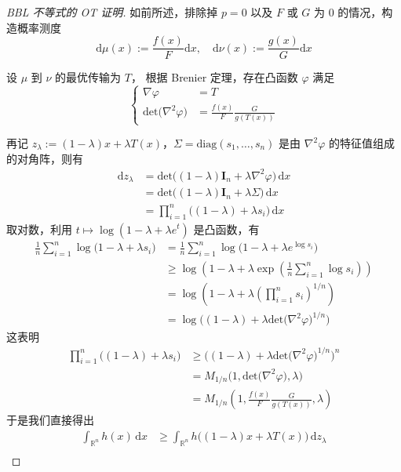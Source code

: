 \begin{proof}[BBL 不等式的 OT 证明]
    
如前所述，排除掉 $p=0$ 以及 $F$ 或 $G$ 为 0 的情况，构造概率测度
\[
\mathrm{d}\mu(x):=\frac{f(x)}{F}\mathrm{d}x,\quad \mathrm{d}\nu(x):=\frac{g(x)}{G}\mathrm{d}x
\]

设 $\mu$ 到 $\nu$ 的最优传输为 $T$， 根据 Brenier 定理，存在凸函数 $\varphi$ 满足
\[
\begin{cases}
\nabla \varphi &=T\\
\mathrm{det}\big(\nabla^2\varphi\big)&=\frac{f(x)}{F}\frac{G}{g(T(x))}
\end{cases}
\]

再记 $z_\lambda:=(1-\lambda)x+\lambda T(x)$，$\Sigma=\mathrm{diag}(s_1,\ldots,s_n)$ 是由 $\nabla^2\varphi$ 的特征值组成的对角阵，则有
\begin{align*}
\mathrm{d}z_\lambda&=\mathrm{det}\big((1-\lambda)\mathbf{I}_n+\lambda \nabla^2\varphi\big)\,\mathrm{d}x\\
&=\mathrm{det}\big((1-\lambda)\mathbf{I}_n+\lambda \Sigma\big)\,\mathrm{d}x\\
&=\prod_{i=1}^n\big((1-\lambda)+\lambda s_i\big)\,\mathrm{d}x
\end{align*}
取对数，利用 $t\mapsto \log(1-\lambda +\lambda e^t)$ 是凸函数，有
\begin{align*}
\frac1n\sum_{i=1}^n\log\big(1-\lambda+\lambda s_i\big)&=\frac1n\sum_{i=1}^n\log\big(1-\lambda+\lambda e^{\log s_i}\big)\\
&\ge \log\left(1-\lambda+\lambda \exp\left(\frac1n\sum_{i=1}^n \log s_i\right)\right) \tag{Jensen}\\
&=\log\left(1-\lambda+\lambda\left(\prod_{i=1}^n s_i\right)^{1/n}\right)\\
&=\log\Big((1-\lambda)+\lambda\mathrm{det}\big(\nabla^2\varphi\big)^{1/n}\Big)
\end{align*}
这表明
\begin{align*}
\prod_{i=1}^n\big((1-\lambda)+\lambda s_i\big)&\ge \Big((1-\lambda)+\lambda\mathrm{det}\big(\nabla^2\varphi\big)^{1/n}\Big)^n\\
&=M_{1/n}\big(1,\mathrm{det}\big(\nabla^2\varphi\big),\lambda\big)\\
&=M_{1/n}\left(1,\frac{f(x)}{F}\frac{G}{g(T(x))},\lambda\right) \label{eq:2-7}\tag{2-7}
\end{align*}
于是我们直接得出
\begin{align*}
\int_{\mathbb{R}^n}h(x)\,\mathrm{d}x&\ge\int_{\mathbb{R}^n}h\big((1-\lambda)x+\lambda T(x)\big)\,\mathrm{d}z_\lambda \tag{换元}\\

\end{align*}
\end{proof}
